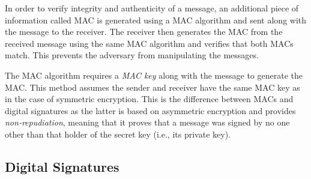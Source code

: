 \documentclass[10pt]{article}
\theoremstyle{plain}
\begin{document}
In order to verify integrity and authenticity of a message, an additional
piece of information called MAC is generated using a MAC algorithm
and sent along with the message to the receiver. The receiver then
generates the MAC from the received message using the same MAC algorithm
and verifies that both MACs match. This prevents the adversary from
manipulating the messages. 

The MAC algorithm requires a \emph{MAC key} along with the message
to generate the MAC. This method assumes the sender and receiver have
the same MAC key as in the case of symmetric encryption. This is the
difference between MACs and digital signatures as the latter is based
on asymmetric encryption and provides \emph{non-repudiation}, meaning
that it proves that a message was signed by no one other than that
holder of the secret key (i.e., its private key).

\subsection{Digital Signatures}
\end{document}
